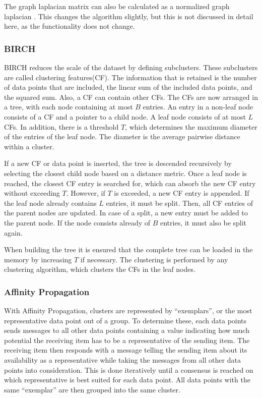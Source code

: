 The graph laplacian matrix can also be calculated as a normalized graph laplacian \cite{spectral_clustering}.
This changes the algorithm slightly, but this is not discussed in detail here, as the functionality does not change.

\subsubsection{BIRCH}
BIRCH reduces the scale of the dataset by defining subclusters.
These subclusters are called clustering features(CF).
The information that is retained is the number of data points that are included, the linear sum of the included data points, and the squared sum.
Also, a CF can contain other CFs.
The CFs are now arranged in a tree, with each node containing at most $B$ entries.
An entry in a non-leaf node consists of a CF and a pointer to a child node.
A leaf node consists of at most $L$ CFs.
In addition, there is a threshold $T$, which determines the maximum diameter of the entries of the leaf node.
The diameter is the average pairwise distance within a cluster.

If a new CF or data point is inserted, the tree is descended recursively by selecting the closest child node based on a distance metric.
Once a leaf node is reached, the closest CF entry is searched for, which can absorb the new CF entry without exceeding $T$.
However, if $T$ is exceeded, a new CF entry is appended.
If the leaf node already contains $L$ entries, it must be split.
Then, all CF entries of the parent nodes are updated.
In case of a split, a new entry must be added to the parent node.
If the node consists already of $B$ entries, it must also be split again.

When building the tree it is ensured that the complete tree can be loaded in the memory by increasing $T$ if necessary.
The clustering is performed by any clustering algorithm, which clusters the CFs in the leaf nodes.\cite{birch}

\subsubsection{Affinity Propagation}
With Affinity Propagation, clusters are represented by ``exemplars'', or the most representative data point out of a group. To determine these, each data points sends messages to all other data points containing a value indicating how much potential the receiving item has to be a representative of the sending item. The receiving item then responds with a message telling the sending item about its availability as a representative while taking the messages from all other data points into consideration. This is done iteratively until a consensus is reached on which representative is best suited for each data point. All data points with the same ``exemplar'' are then grouped into the same cluster.\cite{affinity_propagation}


